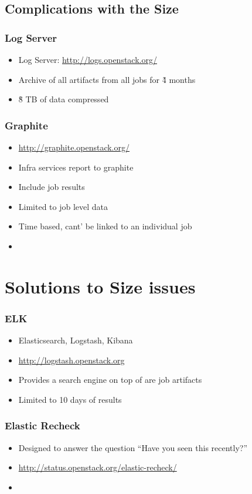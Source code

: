 \documentclass[aspectratio=169,11pt,hyperref={colorlinks=true}]{beamer}
\begin{document}
\subsection{Complications with the Size}
\begin{frame}
    \frametitle{Log Server}
    \begin{itemize}
        \item Log Server: \href{http://logs.openstack.org/}{http://logs.openstack.org/}
        \item Archive of all artifacts from all jobs for \~4 months
        \item \~8 TB of data compressed
    \end{itemize}
\end{frame}

\begin{frame}
    \frametitle{Graphite}
    \begin{itemize}
        \item \href{http://graphite.openstack.org/}{http://graphite.openstack.org/}
        \item Infra services report to graphite
        \item Include job results
        \item Limited to job level data
        \item Time based, cant' be linked to an individual job
        \item
    \end{itemize}
\end{frame}

\section{Solutions to Size issues}
\begin{frame}
    \frametitle{ELK}
    \begin{itemize}
        \item Elasticsearch, Logstash, Kibana
        \item \href{http://logstash.openstack.org}{http://logstash.openstack.org}
        \item Provides a search engine on top of are job artifacts
        \item Limited to 10 days of results
    \end{itemize}
\end{frame}

\begin{frame}
    \frametitle{Elastic Recheck}
    \begin{itemize}
        \item Designed to answer the question ``Have you seen this recently?''
        \item \href{http://status.openstack.org/elastic-recheck/}{http://status.openstack.org/elastic-recheck/}
        \item
    \end{itemize}
\end{frame}
\end{document}
